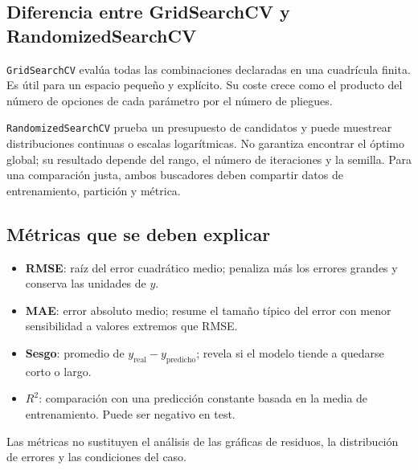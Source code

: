 \documentclass[11pt,a4paper]{article}
\begin{document}
\subsection{Diferencia entre GridSearchCV y RandomizedSearchCV}
\texttt{GridSearchCV} evalúa todas las combinaciones declaradas en una cuadrícula finita. Es útil para un espacio pequeño y explícito. Su coste crece como el producto del número de opciones de cada parámetro por el número de pliegues.

\texttt{RandomizedSearchCV} prueba un presupuesto de candidatos y puede muestrear distribuciones continuas o escalas logarítmicas. No garantiza encontrar el óptimo global; su resultado depende del rango, el número de iteraciones y la semilla. Para una comparación justa, ambos buscadores deben compartir datos de entrenamiento, partición y métrica.

\subsection{Métricas que se deben explicar}
\begin{itemize}
\item \textbf{RMSE}: raíz del error cuadrático medio; penaliza más los errores grandes y conserva las unidades de $y$.
\item \textbf{MAE}: error absoluto medio; resume el tamaño típico del error con menor sensibilidad a valores extremos que RMSE.
\item \textbf{Sesgo}: promedio de $y_{\mathrm{real}}-y_{\mathrm{predicho}}$; revela si el modelo tiende a quedarse corto o largo.
\item \textbf{$R^2$}: comparación con una predicción constante basada en la media de entrenamiento. Puede ser negativo en test.
\end{itemize}
Las métricas no sustituyen el análisis de las gráficas de residuos, la distribución de errores y las condiciones del caso.
\end{document}
